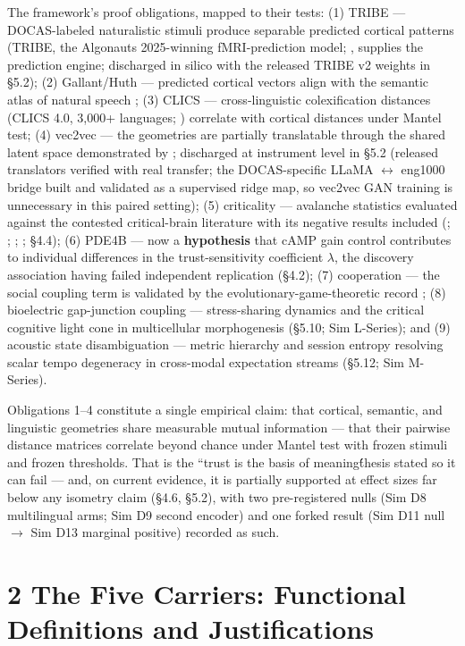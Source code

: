 \documentclass[
]{article}
\begin{document}
The framework's proof obligations, mapped to their tests: (1) TRIBE ---
DOCAS-labeled naturalistic stimuli produce separable predicted cortical
patterns (TRIBE, the Algonauts 2025-winning fMRI-prediction model; ,
supplies the prediction engine; discharged in silico with the released
TRIBE v2 weights in §5.2); (2) Gallant/Huth --- predicted cortical
vectors align with the semantic atlas of natural speech ; (3) CLICS ---
cross-linguistic colexification distances (CLICS 4.0, 3,000+ languages;
) correlate with cortical distances under Mantel test; (4) vec2vec ---
the geometries are partially translatable through the shared latent
space demonstrated by ; discharged at instrument level in §5.2 (released
translators verified with real transfer; the DOCAS-specific LLaMA
\(\leftrightarrow\) eng1000 bridge built and validated as a supervised
ridge map, so vec2vec GAN training is unnecessary in this paired
setting); (5) criticality --- avalanche statistics evaluated against the
contested critical-brain literature with its negative results included
(; ; ; ; §4.4); (6) PDE4B --- now a \textbf{hypothesis} that cAMP gain
control contributes to individual differences in the trust-sensitivity
coefficient \(\lambda\), the discovery association having failed
independent replication (§4.2); (7) cooperation --- the social coupling
term is validated by the evolutionary-game-theoretic record ; (8)
bioelectric gap-junction coupling --- stress-sharing dynamics and the
critical cognitive light cone in multicellular morphogenesis (§5.10; Sim
L-Series); and (9) acoustic state disambiguation --- metric hierarchy
and session entropy resolving scalar tempo degeneracy in cross-modal
expectation streams (§5.12; Sim M-Series).

Obligations 1--4 constitute a single empirical claim: that cortical,
semantic, and linguistic geometries share measurable mutual information
--- that their pairwise distance matrices correlate beyond chance under
Mantel test with frozen stimuli and frozen thresholds. That is the
``trust is the basis of meaningt́́hesis stated so it can fail --- and, on
current evidence, it is partially supported at effect sizes far below
any isometry claim (§4.6, §5.2), with two pre-registered nulls (Sim D8
multilingual arms; Sim D9 second encoder) and one forked result (Sim D11
null \(\to\) Sim D13 marginal positive) recorded as such.

\section{2 The Five Carriers: Functional Definitions and
Justifications}\label{the-five-carriers-functional-definitions-and-justifications}
\end{document}
